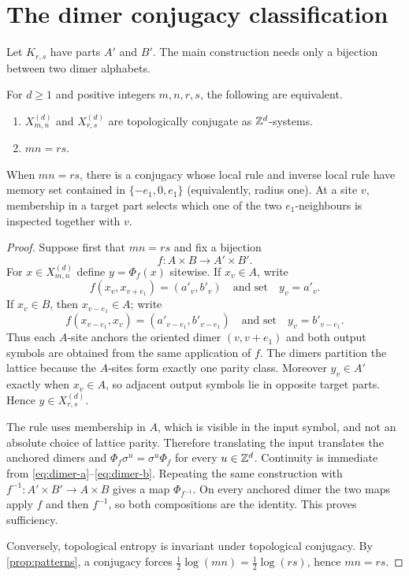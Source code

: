 \section{The dimer conjugacy classification}\label{sec:conjugacy}

Let $K_{r,s}$ have parts $A'$ and $B'$.  The main construction needs only a
bijection between two dimer alphabets.

\begin{theorem}\label{thm:classification}
For $d\geq1$ and positive integers $m,n,r,s$, the following are equivalent.
\begin{enumerate}
\item $X_{m,n}^{(d)}$ and $X_{r,s}^{(d)}$ are topologically conjugate as
$\mathbb Z^d$-systems.
\item $mn=rs$.
\end{enumerate}
When $mn=rs$, there is a conjugacy whose local rule and inverse local rule
have memory set contained in $\{-e_1,0,e_1\}$ (equivalently, radius one).
At a site $v$, membership in a target part selects which one of the two
$e_1$-neighbours is inspected together with $v$.
\end{theorem}

\begin{proof}
Suppose first that $mn=rs$ and fix a bijection
\[
 f:A\times B\longrightarrow A'\times B'.
\]
For $x\in X_{m,n}^{(d)}$ define $y=\Phi_f(x)$ sitewise.  If $x_v\in A$,
write
\[
 f(x_v,x_{v+e_1})=(a'_v,b'_v)
 \quad\text{and set}\quad y_v=a'_v.
 \tag{3.1}\label{eq:dimer-a}
\]
If $x_v\in B$, then $x_{v-e_1}\in A$; write
\[
 f(x_{v-e_1},x_v)=(a'_{v-e_1},b'_{v-e_1})
 \quad\text{and set}\quad y_v=b'_{v-e_1}.
 \tag{3.2}\label{eq:dimer-b}
\]
Thus each $A$-site anchors the oriented dimer $(v,v+e_1)$ and both output
symbols are obtained from the same application of $f$.  The dimers partition
the lattice because the $A$-sites form exactly one parity class.  Moreover
$y_v\in A'$ exactly when $x_v\in A$, so adjacent output symbols lie in
opposite target parts.  Hence $y\in X_{r,s}^{(d)}$.

The rule uses membership in $A$, which is visible in the input symbol, and
not an absolute choice of lattice parity.  Therefore translating the input
translates the anchored dimers and
$\Phi_f\sigma^u=\sigma^u\Phi_f$ for every $u\in\mathbb Z^d$.  Continuity is
immediate from \eqref{eq:dimer-a}--\eqref{eq:dimer-b}.  Repeating the same
construction with $f^{-1}:A'\times B'\to A\times B$ gives a map
$\Phi_{f^{-1}}$.  On every anchored dimer the two maps apply $f$ and then
$f^{-1}$, so both compositions are the identity.  This proves sufficiency.

Conversely, topological entropy is invariant under topological conjugacy.
By \cref{prop:patterns}, a conjugacy forces
$\frac12\log(mn)=\frac12\log(rs)$, hence $mn=rs$.
\end{proof}

